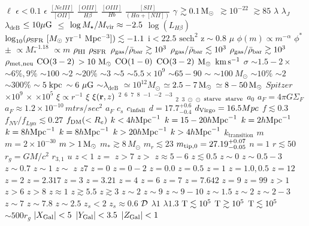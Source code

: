 $\ell$  $\epsilon < 0.1$  $\epsilon$  $\frac{[NeIII]}{[OII]}$  $\frac{[OIII]}{H\beta}$  $\frac{[OIII]}{Hb}$  $\frac{[SII]}{(H\alpha +[NII])}$  $\gamma$  $\gtrsim 0.1 \, {\rm M}_\odot$  $\gtrsim 10^{-22}$  $\gtrsim{}85$  $\lambda$  $\lambda_J$  $\lambda_\text{deB}$  $\leq10\mu{\rm G}$  $\leqslant$  $\log M_\star/M_{\rm vir}\approx-2.5$  $\log(L_{H\beta})$  $\log_{10}(\rho_{\rm SFR}\ [M_\odot\ \mathrm{yr^{-1}\ Mpc^{-3}}])\lesssim-1.1$  $\mathrm{i}<22.5$  $\mathrm{sech^2}$  $\mathrm{z \sim 0.8}$  $\mu$  $\phi(m) \propto m^{-\alpha}$  $\phi^*$  $\pm$  $\propto M_*^{-1.18}$  $\propto m$  $\rho_{\rm HI}$  $\rho_{\rm SFR}$  $\rho_{\rm gas}/\bar{\rho}_{\rm bar}\gtrsim10^3$  $\rho_{\rm gas}/\bar{\rho}_{\rm bar}\lesssim10^3$  $\rho_{\rm gas}/\bar{\rho}_{\rm bar}\gtrsim10^3$  $\rho_{\rm met,neu}$  $\rm CO(3-2)$  $\rm > 10~ M_{\odot}$  $\rm CO(1-0)$  $\rm CO(3-2)$  $\rm M_{\odot}$  $\rm km\,s^{-1}$  $\sigma$  $\sim 1.5 - 2\times$  $\sim 6\%, 9\%$  $\sim 100$  $\sim 2$  $\sim 20\%$  $\sim 3$  $\sim 5$  $\sim 5.5 \times 10^{9}$  $\sim 65 - 90$  $\sim$  $\sim100~M_\odot$  $\sim10\%$  $\sim2$  $\sim300\%$  $\sim5\;{\rm kpc}$  $\sim6~\mu{\rm G}$  $\sim\lambda_\text{deB}$  $\simeq 10^{12}M_\odot$  $\simeq 2.5-7 \,{\rm M}_\odot$  $\simeq 8-50 \,{\rm M}_\odot$  $\textit{Spitzer}$  $\times 10^9$  $\times$  $\times10^5$  $\xi \propto r^{-1}$  $\xi$  $\xi({\bf r}, z)$  $^2$  $^6$  $^7$  $^8$  $^{-1}$  $^{-2}$  $^{-3}$  $_2$  $_3$  $_\odot$  $_{\odot}$  $_{\rm starve}$  $_{\rm starve}$  $a_0$  $a_F = 4 \pi G \Sigma_F$  $a_F \approx 1.2 \times 10^{-10}\, mtrs/sec^2$  $a_F$  $c_s$  $c_{\rm infall}$  $d=17.7^{+0.6}_{-0.4}$  $d_{\rm Virgo} = 16.5 Mpc$  $f\lesssim0.3$  $f_{NV}/f_{Ly\alpha} \lesssim 0.27$  $f_{\rm DM}(<R_e)$  $k<4h{\rm Mpc}^{-1}$  $k=15-20h{\rm Mpc}^{-1}$  $k=2h{\rm Mpc}^{-1}$  $k=8h{\rm Mpc}^{-1}$  $k=8h{\rm Mpc}^{-1}$  $k>20h{\rm Mpc}^{-1}$  $k>4h{\rm Mpc}^{-1}$  $k_\mathrm{transition}$  $m$  $m=2 \times 10^{-30}$  $m>1\,{\rm M}_\odot$  $m_* \gtrsim 8 \, M_\odot$  $m_r \lesssim 23$  $m_{\rm tip,0} = 27.19^{+0.07}_{-0.05}$  $n=1$  $r\lesssim 50$  $r_g=GM/c^2$  $r_{3,1}$  $u$  $z < 1$  $z =$  $z > 7$  $z >$  $z \approx 5 - 6$  $z \lesssim 0.5$  $z \sim 0$  $z \sim 0.5 - 3$  $z \sim 0.7$  $z \sim 1$  $z \sim$  $z$  $z7$  $z=0$  $z=0-2$  $z=0.0$  $z=0.5$  $z=1$  $z=1.0, 0.5$  $z=12$  $z=2$  $z=2.317$  $z=3$  $z=3.21$  $z=4$  $z=6$  $z=7$  $z=7.642$  $z=9$  $z=99$  $z>1$  $z>6$  $z>8$  $z\approx1$  $z\gtrsim5.5$  $z\gtrsim{}3$  $z\sim 2$  $z\sim 9$  $z\sim 9-10$  $z\sim1.5$  $z\sim2$  $z\sim2-3$  $z\sim7$  $z\sim7.8$  $z\sim{}2.5$  $z_s < 2$  $z_s\approx 0.6$  ${\cal D}$  ${\lambda}1$  ${\lambda}1.3$  ${\rm T}\lesssim10^{5}$  ${\rm T}\gtrsim10^{5}$  ${\rm T}\lesssim10^{5}$  ${\sim}500r_g$  $|X_{\rm Gal}| <5$  $|Y_{\rm Gal}| <3.5$  $|Z_{\rm Gal}| <1$
